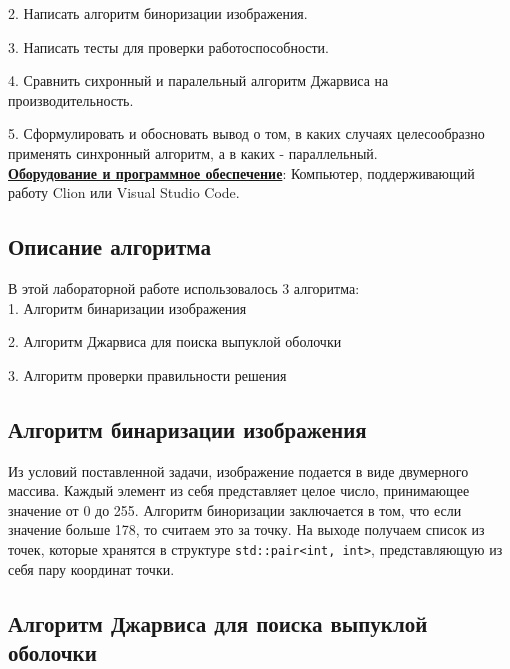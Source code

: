 \documentclass[a4paper, 12pt]{article}
\begin{document}
2. Написать алгоритм биноризации изображения.

3. Написать тесты для проверки работоспособности.

4. Сравнить сихронный и паралельный алгоритм Джарвиса на производительность.

5. Сформулировать и обосновать вывод о том, в каких случаях целесообразно применять синхронный алгоритм, а в каких - параллельный. \\[2mm]


\underline{\textbf{Оборудование и программное обеспечение}}: Компьютер, поддерживающий работу Clion или Visual Studio Code.

\newpage
\begin{center}
    \section{Описание алгоритма}
\end{center}

В этой лабораторной работе использовалось 3 алгоритма:\\[2mm]

1. Алгоритм бинаризации изображения

2. Алгоритм Джарвиса для поиска выпуклой оболочки

3. Алгоритм проверки правильности решения\\[2mm]

\begin{center}
    \subsection{Алгоритм бинаризации изображения}
\end{center}

Из условий поставленной задачи, изображение подается в виде двумерного массива. Каждый элемент из себя представляет целое число, принимающее значение от 0 до 255. Алгоритм биноризации заключается в том, что если значение больше 178, то считаем это за точку. На выходе получаем список из точек, которые хранятся в структуре  \texttt{std::pair<int, int>}, представляющую из себя пару координат точки.

\begin{center}
    \subsection{Алгоритм Джарвиса для поиска выпуклой оболочки}
\end{center}
\end{document}
